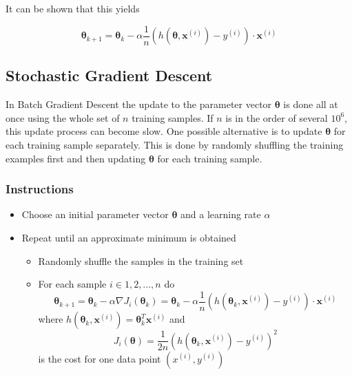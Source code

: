 \documentclass[11pt]{article}
\begin{document}
It can be shown that this yields

\begin{equation}
    \bm{\theta}_{k+1} = \bm{\theta}_{k} -\alpha\frac{1}{n}(h(\bm{\theta},\bm{x}^{(i)})-y^{(i)})\cdot\bm{x}^{(i)}
\end{equation}

\subsection{Stochastic Gradient Descent}
In Batch Gradient Descent the update to the parameter vector $\bm{\theta}$ is done all at once using the whole set of $n$ training samples. If $n$ is in the order of several $10^6$, this update process can become slow. One possible alternative is to update $\bm{\theta}$ for each training sample separately. This is done by randomly shuffling the training examples first and then updating $\bm{\theta}$ for each training sample.

\subsubsection{Instructions}
\begin{itemize}
    \item Choose an initial parameter vector $\bm{\theta}$ and a learning rate $\alpha$
    \item Repeat until an approximate minimum is obtained
          \begin{itemize}
              \item Randomly shuffle the samples in the training set
              \item For each sample $i \in {1,2,...,n}$ do
                    \begin{equation*}
                        \bm{\theta}_{k+1} = \bm{\theta}_{k} -\alpha\nabla J_i(\bm{\theta}_k) = \bm{\theta}_{k} -\alpha\frac{1}{n}(h(\bm{\theta}_k,\bm{x}^{(i)})-y^{(i)})\cdot\bm{x}^{(i)}
                    \end{equation*}
                    where $h(\bm{\theta}_k,\bm{x}^{(i)})=\bm{\theta}_k^T \bm{x}^{(i)}$ and
                    \begin{equation*}
                        J_i(\bm{\theta}) = \frac{1}{2n}(h(\bm{\theta}_k,\bm{x}^{(i)})-y^{(i)})^2
                    \end{equation*}
                    is the cost for one data point $(x^{(i)},y^{(i)})$
          \end{itemize}
\end{itemize}
\end{document}
